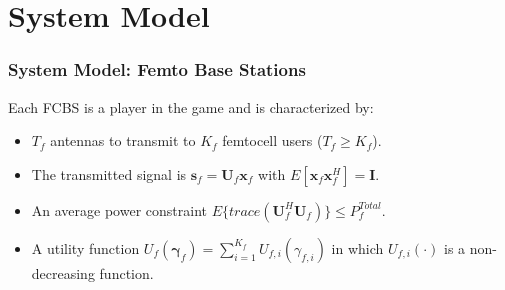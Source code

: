 \documentclass[10pt,tgadventor, onlymath]{beamer}
\begin{document}
\section{System Model}
\begin{frame}
\frametitle{System Model: Femto Base Stations}
Each FCBS is a player in the game and is characterized by:
\\
\begin{itemize}
\setlength\itemsep{2em}

\item 
	$T_{f}$ antennas to transmit to $K_{f}$ femtocell users ($T_{f} \geq K_{f}$).
\item 
	The transmitted 		
	signal is $\mathbf{s}_{f
	}= \mathbf{U}_{f}\mathbf{x}_{f}$ with $E[\mathbf{x}_{f}\mathbf{x}_{f}^H] = \mathbf{I}$.
\item 
	An average power constraint $E\{trace(\mathbf{U}_{f}^H\mathbf{U}_{f})\} \leq P^{Total}_{f} $.
\item 
	A utility function $U_{f}(\boldsymbol{\gamma}_{f}) =
	\sum_{i=1}^{K_{f}}
    	 U_{f,i}(\gamma_{f,i}) $
    	in which $U_{f,i}(\cdot)$ is a non-decreasing function.
\end{itemize}
\end{frame}

\end{document}
